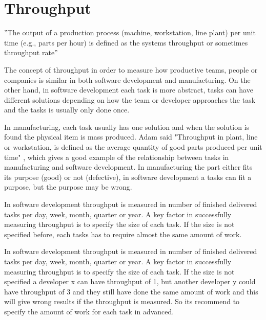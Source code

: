 \documentclass[UKenglish]{ifimaster}  %
\begin{document}
\section{Throughput}
''The output of a production process (machine, workstation, line plant) per unit time (e.g., parts per hour) is defined as the systems throughput or sometimes throughput rate'' \parencite{Adams}

The concept of throughput in order to measure how productive teams, people or companies is similar in both software development and manufacturing. On the other hand, in software development each task is more abstract, tasks can have different solutions depending on how the team or developer approaches the task and the tasks is usually only done once.

In manufacturing, each task usually has one solution and when the solution is found the physical item is mass produced.  Adam said "Throughput in plant, line or workstation, is defined as the average quantity of good  parts produced per unit time" \parencite{Adams}, which gives a good example of the relationship between tasks in manufacturing and software development. In manufacturing the part either fits its purpose (good) or not (defective), in software development a tasks can fit a purpose, but the purpose may be wrong.
 
In software development throughput is measured in number of finished delivered tasks per day, week, month, quarter or year. A key factor in successfully measuring throughput is to specify the size of each task. If the size is not specified   before, each tasks has to require almost the same amount of work.  

In software development throughput is measured in number of finished delivered tasks per day, week, month, quarter or year. A key factor in successfully measuring throughput is to specify the size of each task. If the size is not specified a developer x can have throughput of 1, but another developer y could have throughput of 3 and they still have done the same amount of work and this will give wrong results if the throughput is measured.  So its recommend to specify the amount of work for each task in advanced. 
\end{document}
